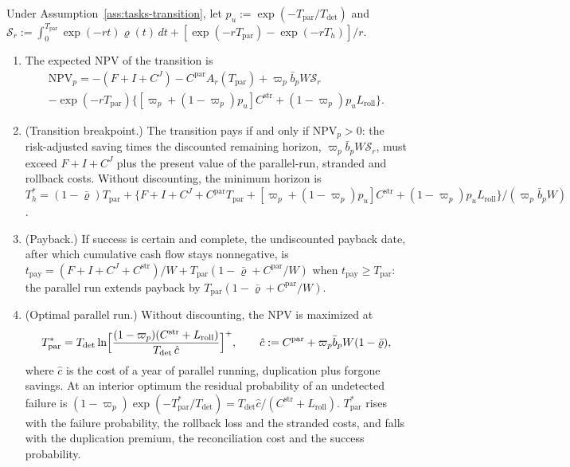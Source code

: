 \begin{proposition}\label{prop:tasks-transition}
Under Assumption~\ref{ass:tasks-transition}, let $p_u:=\exp(-T_{\mathrm{par}}/T_{\mathrm{det}})$ and $\mathcal S_r:=\int_0^{T_{\mathrm{par}}}\exp(-rt)\varrho(t)\,dt+[\exp(-rT_{\mathrm{par}})-\exp(-rT_h)]/r$.
\begin{enumerate}
\item[(a)] The expected NPV of the transition is
\begin{multline}\label{eq:tasks-npv}
\mathrm{NPV}_p=-(F+I+C^J)-C^{\mathrm{par}}A_r(T_{\mathrm{par}})+\varpi_p\bar b_pW\mathcal S_r\\
-\exp(-rT_{\mathrm{par}})\bigl\{[\varpi_p+(1-\varpi_p)p_u]C^{\mathrm{str}}+(1-\varpi_p)p_uL_{\mathrm{roll}}\bigr\}.
\end{multline}
\item[(b)] (Transition breakpoint.) The transition pays if and only if $\mathrm{NPV}_p>0$: the risk-adjusted saving times the discounted remaining horizon, $\varpi_p\bar b_pW\mathcal S_r$, must exceed $F+I+C^J$ plus the present value of the parallel-run, stranded and rollback costs. Without discounting, the minimum horizon is $T_h^*=(1-\bar\varrho)T_{\mathrm{par}}+\{F+I+C^J+C^{\mathrm{par}}T_{\mathrm{par}}+[\varpi_p+(1-\varpi_p)p_u]C^{\mathrm{str}}+(1-\varpi_p)p_uL_{\mathrm{roll}}\}/(\varpi_p\bar b_pW)$.
\item[(c)] (Payback.) If success is certain and complete, the undiscounted payback date, after which cumulative cash flow stays nonnegative, is $t_{\mathrm{pay}}=(F+I+C^J+C^{\mathrm{str}})/W+T_{\mathrm{par}}(1-\bar\varrho+C^{\mathrm{par}}/W)$ when $t_{\mathrm{pay}}\ge T_{\mathrm{par}}$: the parallel run extends payback by $T_{\mathrm{par}}(1-\bar\varrho+C^{\mathrm{par}}/W)$.
\item[(d)] (Optimal parallel run.) Without discounting, the NPV is maximized at
\begin{equation}\label{eq:tasks-tpar}
T^*_{\mathrm{par}}=T_{\mathrm{det}}\ln\Bigl[\frac{(1-\varpi_p)(C^{\mathrm{str}}+L_{\mathrm{roll}})}{T_{\mathrm{det}}\,\hat c}\Bigr]^+,\qquad\hat c:=C^{\mathrm{par}}+\varpi_p\bar b_pW(1-\bar\varrho),
\end{equation}
where $\hat c$ is the cost of a year of parallel running, duplication plus forgone savings. At an interior optimum the residual probability of an undetected failure is $(1-\varpi_p)\exp(-T^*_{\mathrm{par}}/T_{\mathrm{det}})=T_{\mathrm{det}}\hat c/(C^{\mathrm{str}}+L_{\mathrm{roll}})$. $T^*_{\mathrm{par}}$ rises with the failure probability, the rollback loss and the stranded costs, and falls with the duplication premium, the reconciliation cost and the success probability.
\end{enumerate}
\end{proposition}

